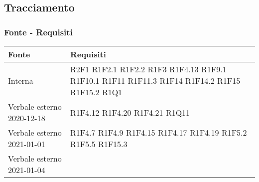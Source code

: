 \subsection{Tracciamento}
\subsubsection{Fonte - Requisiti}
\begin{center}
	\begin{longtable}{|p{44mm}|p{22mm}|}
		\hline
		\rowcolor{lighter-grayer}
		\textbf{Fonte} &  \textbf{Requisiti}  \\
		\hline
		\endhead
		
		
		
		 Interna & 
		 R2F1 \newline
		 	R1F2.1 \newline
		 	R1F2.2 \newline
			R1F3 \newline 	 
			R1F4.13 \newline
			R1F9.1 \newline
			R1F10.1 \newline
			R1F11 \newline
			R1F11.3 \newline
			R1F14 \newline
			R1F14.2 \newline
			R1F15 \newline
			R1F15.2 \newline
			R1Q1
	    \\
		\hline
		Verbale esterno 2020-12-18 & 
		
			R1F4.12 \newline
			R1F4.20 \newline
			R1F4.21 \newline
			R1Q11
	\\
	\hline
	Verbale esterno 2021-01-01 & 
		R1F4.7 \newline
		R1F4.9 \newline
		R1F4.15 \newline
		R1F4.17 \newline
		R1F4.19 \newline
		R1F5.2 \newline
		R1F5.5 \newline
		R1F15.3
\\
\hline
Verbale esterno 2021-01-04 & 


\end{longtable}
\end{center}
